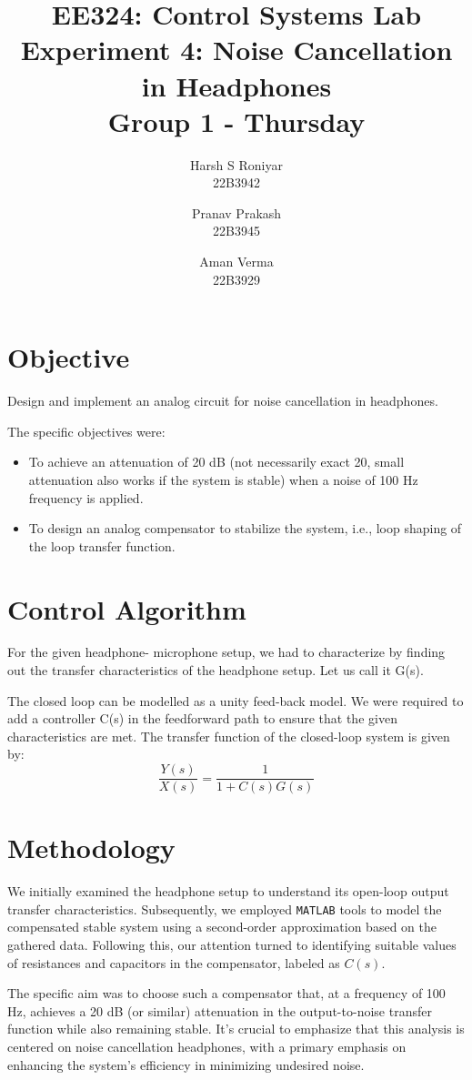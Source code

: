 \documentclass{article}
\title{EE324: Control Systems Lab \\ Experiment 4: Noise Cancellation in Headphones\\ \textbf{Group 1 - Thursday}}
\author{\large Harsh S Roniyar\\ \large 22B3942 \and \large Pranav Prakash\\ \large 22B3945 \and \large Aman Verma\\ \large 22B3929}
\begin{document}
\maketitle

\section{Objective}

Design and implement an analog circuit for noise cancellation in headphones.
\vspace{5pt}

The specific objectives were:
\begin{itemize}[noitemsep]
  \item To achieve an attenuation of 20 dB (not necessarily exact 20, small attenuation also works if the system is stable) when a noise of 100 Hz frequency is applied.
  \item To design an analog compensator to stabilize the system, i.e., loop shaping of the loop transfer function.
\end{itemize}

\section{Control Algorithm}

For the given headphone- microphone setup, we had to characterize by finding out the transfer characteristics of the headphone setup. Let us call it G(s). 

The closed loop can be modelled as a unity feed-back model. We were required to add a controller C(s) in the feedforward path to ensure that the given characteristics are met. The transfer function of the closed-loop system is given by:
\[ \frac{Y(s)}{X(s)} = \frac{1}{1 + C(s)G(s)} \]

\section{Methodology}

We initially examined the headphone setup to understand its open-loop output transfer characteristics. Subsequently, we employed \texttt{MATLAB} tools to model the compensated stable system using a second-order approximation based on the gathered data. Following this, our attention turned to identifying suitable values of resistances and capacitors in the compensator, labeled as \(C(s)\).

The specific aim was to choose such a compensator that, at a frequency of 100 Hz, achieves a 20 dB (or similar) attenuation in the output-to-noise transfer function while also remaining stable. It's crucial to emphasize that this analysis is centered on noise cancellation headphones, with a primary emphasis on enhancing the system's efficiency in minimizing undesired noise.
\end{document}
